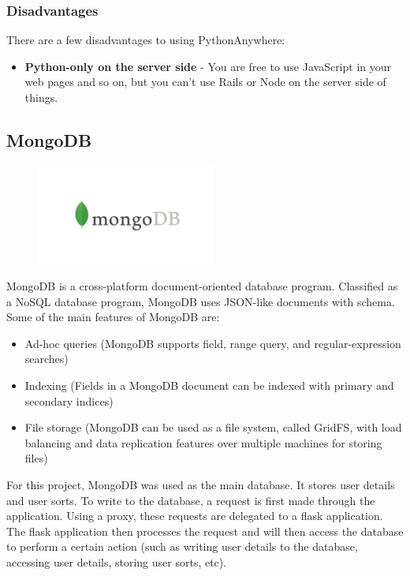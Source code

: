 \subsubsection{Disadvantages}
There are a few disadvantages to using PythonAnywhere:

\begin{itemize}
    \item \textbf{Python-only on the server side} - You are free to use
    JavaScript in your web pages and so on, but you can't use Rails or Node on 
    the server side of things.
\end{itemize}

\subsection{MongoDB}
\par
\medskip
\begin{center}
    \includegraphics[width=8cm,height=3.3cm,keepaspectratio]{images/mongodb}
\end{center}
MongoDB is a cross-platform document-oriented database program. Classified as a
NoSQL database program, MongoDB uses JSON-like documents with schema. Some of 
the main features of MongoDB are:

\begin{itemize}
    \item Ad-hoc queries (MongoDB supports field, range query, and
    regular-expression searches)
    \item Indexing (Fields in a MongoDB document can be indexed with primary and
    secondary indices)
    \item File storage (MongoDB can be used as a file system, called GridFS,
    with load balancing and data replication features over multiple machines for
    storing files)  
\end{itemize}

For this project, MongoDB was used as the main database. It stores user details
and user sorts. To write to the database, a request is first made through the 
application. Using a proxy, these requests are delegated to a flask application.
The flask application then processes the request and will then access the 
database to perform a certain action (such as writing user details to the 
database, accessing user details, storing user sorts, etc). 

